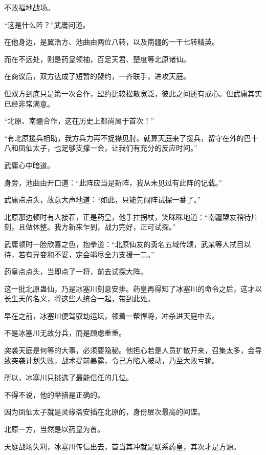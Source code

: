 
\begin{this_body}



不败福地战场。

“这是什么阵？”武庸问道。

在他身边，是翼浩方、池曲由两位八转，以及南疆的一干七转精英。

而在不远处，则是药皇领袖，百足天君、楚度等北原诸仙。

在商议后，双方达成了短暂的盟约，一齐联手，进攻天庭。

但双方到底只是第一次合作，盟约比较松散宽泛，彼此之间还有戒心。但武庸其实已经非常满意。

“北原、南疆合作，这在历史上都尚属于首次！”

“有北原援兵相助，我方兵力再不捉襟见肘。就算天庭来了援兵，留守在外的巴十八和凤仙太子，也足够支撑一会，让我们有充分的反应时间。”

武庸心中暗道。

身旁，池曲由开口道：“此阵应当是新阵，我从未见过有此阵的记载。”

武庸点点头，故意大声地道：“如此，只能先闯阵试探一番了。”

北原那边顿时有人接茬，正是药皇，他手拄拐杖，笑眯眯地道：“南疆盟友稍待片刻，且做休整。我方新来乍到，战力完好，正可试探。”

武庸顿时一脸欣喜之色，抱拳道：“北原仙友的勇名五域传颂，武某等人拭目以待，若有异变和不妥，定会竭尽全力支援一二。”

药皇点点头，当即点了一将，前去试探大阵。

这一批北原蛊仙，乃是冰塞川刻意安排。药皇再得知了冰塞川的命令之后，这才以长生天的名义，将这些人统合一起，带到此处。

早在之前，冰塞川便驾驭劫运坛，领着一帮悍将，冲杀进天庭中去。

不是冰塞川无故分兵，而是顾虑重重。

突袭天庭是何等的大事，必须要隐秘。他担心若是人员扩散开来，召集太多，会导致突袭计划失败，战术提前暴露，令己方陷入被动，乃至大败亏输。

所以，冰塞川只挑选了最能信任的几位。

不得不说，他的举措是正确的。

因为凤仙太子就是灵缘斋安插在北原的，身份层次最高的间谍。

北原一方，当然是以药皇为首。

天庭战场失利，冰塞川传信出去，首当其冲就是联系药皇，其次才是方源。


\end{this_body}
